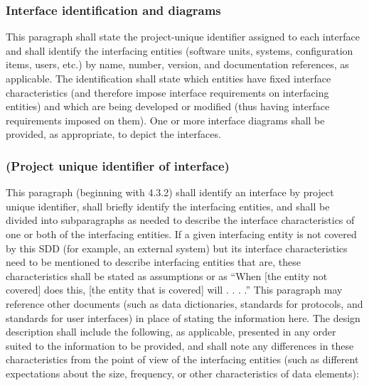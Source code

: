 \subsubsection{Interface identification and diagrams}

This paragraph shall state the project-unique identifier assigned to
each interface and shall identify the interfacing entities (software
units, systems, configuration items, users, etc.) by name, number,
version, and documentation references, as applicable. The identification
shall state which entities have fixed interface characteristics (and
therefore impose interface requirements on interfacing entities) and
which are being developed or modified (thus having interface
requirements imposed on them). One or more interface diagrams shall be
provided, as appropriate, to depict the interfaces.

\subsubsection{(Project unique identifier of interface)}

This paragraph (beginning with 4.3.2) shall identify an interface by
project unique identifier, shall briefly identify the interfacing
entities, and shall be divided into subparagraphs as needed to describe
the interface characteristics of one or both of the interfacing
entities. If a given interfacing entity is not covered by this SDD (for
example, an external system) but its interface characteristics need to
be mentioned to describe interfacing entities that are, these
characteristics shall be stated as assumptions or as ``When {[}the
entity not covered{]} does this, {[}the entity that is covered{]} will .
. . .'' This paragraph may reference other documents (such as data
dictionaries, standards for protocols, and standards for user
interfaces) in place of stating the information here. The design
description shall include the following, as applicable, presented in any
order suited to the information to be provided, and shall note any
differences in these characteristics from the point of view of the
interfacing entities (such as different expectations about the size,
frequency, or other characteristics of data elements):

